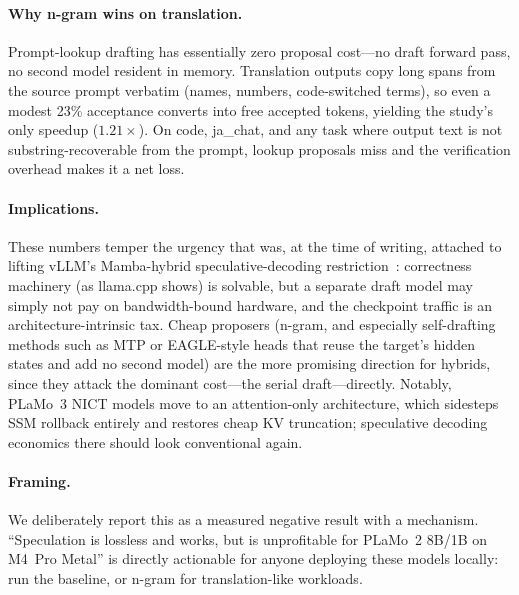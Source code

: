 \documentclass[10pt]{article}
\begin{document}
\paragraph{Why n-gram wins on translation.} Prompt-lookup drafting has
essentially zero proposal cost---no draft forward pass, no second model
resident in memory. Translation outputs copy long spans from the source
prompt verbatim (names, numbers, code-switched terms), so even a modest
23\% acceptance converts into free accepted tokens, yielding the study's
only speedup ($1.21\times$). On code, ja\_chat, and any task where output
text is not substring-recoverable from the prompt, lookup proposals miss
and the verification overhead makes it a net loss.

\paragraph{Implications.} These numbers temper the urgency that was, at the
time of writing, attached to lifting vLLM's Mamba-hybrid
speculative-decoding restriction~\cite{vllmissue}:
correctness machinery (as llama.cpp shows) is solvable, but a separate
draft model may simply not pay on bandwidth-bound hardware, and the
checkpoint traffic is an architecture-intrinsic tax. Cheap proposers
(n-gram, and especially self-drafting methods such as MTP or EAGLE-style
heads that reuse the target's hidden states and add no second model) are
the more promising direction for hybrids, since they attack the dominant
cost---the serial draft---directly. Notably, PLaMo~3 NICT models move to an
attention-only architecture, which sidesteps SSM rollback entirely and
restores cheap KV truncation; speculative decoding economics there should
look conventional again.

\paragraph{Framing.} We deliberately report this as a measured negative
result with a mechanism. ``Speculation is lossless and works, but is
unprofitable for PLaMo~2 8B/1B on M4~Pro Metal'' is directly actionable for
anyone deploying these models locally: run the baseline, or n-gram for
translation-like workloads.
\end{document}
